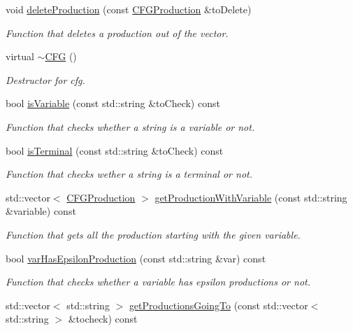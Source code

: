 \begin{DoxyCompactItemize}
void \hyperlink{classCFG_acd474c77447e00eadd4a0b82ee1f765c}{delete\+Production} (const \hyperlink{classCFGProduction}{C\+F\+G\+Production} \&to\+Delete)
\begin{DoxyCompactList}\small\item\em Function that deletes a production out of the vector. \end{DoxyCompactList}\item 
\mbox{\label{classCFG_a7a9e0feb406099038faea4c67ef31786}} 
virtual \hyperlink{classCFG_a7a9e0feb406099038faea4c67ef31786}{$\sim$\+C\+FG} ()
\begin{DoxyCompactList}\small\item\em Destructor for cfg. \end{DoxyCompactList}\item 
bool \hyperlink{classCFG_a909dec00a27b31ff8522e9300edcd593}{is\+Variable} (const std\+::string \&to\+Check) const
\begin{DoxyCompactList}\small\item\em Function that checks whether a string is a variable or not. \end{DoxyCompactList}\item 
bool \hyperlink{classCFG_ae3e42c620977ec6075dae6c8328f0c30}{is\+Terminal} (const std\+::string \&to\+Check) const
\begin{DoxyCompactList}\small\item\em Function that checks wether a string is a terminal or not. \end{DoxyCompactList}\item 
std\+::vector$<$ \hyperlink{classCFGProduction}{C\+F\+G\+Production} $>$ \hyperlink{classCFG_abeb17f6d00f2f29f0765340e0f5a3fa7}{get\+Production\+With\+Variable} (const std\+::string \&variable) const
\begin{DoxyCompactList}\small\item\em Function that gets all the production starting with the given variable. \end{DoxyCompactList}\item 
bool \hyperlink{classCFG_aa9e56706a12d26ca22295e6b4f82688a}{var\+Has\+Epsilon\+Production} (const std\+::string \&var) const
\begin{DoxyCompactList}\small\item\em Function that checks whether a variable has epsilon productions or not. \end{DoxyCompactList}\item 
std\+::vector$<$ std\+::string $>$ \hyperlink{classCFG_a49ffc508da502373b47a6294a1f0ca0b}{get\+Productions\+Going\+To} (const std\+::vector$<$ std\+::string $>$ \&tocheck) const

\end{DoxyCompactItemize}
